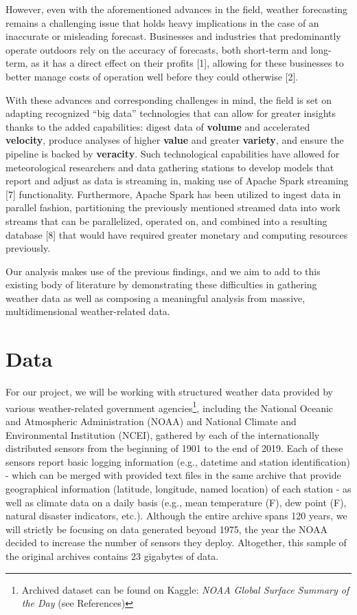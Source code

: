 \documentclass[conference]{IEEEtran}
\begin{document}
However, even with the aforementioned advances in the field, weather forecasting remains a challenging issue that holds heavy implications in the case of an inaccurate or misleading forecast. Businesses and industries that predominantly operate outdoors rely on the accuracy of forecasts, both short-term and long-term, as it has a direct effect on their profits [1], allowing for these businesses to better manage costs of operation well before they could otherwise [2].

With these advances and corresponding challenges in mind, the field is set on adapting recognized ``big data'' technologies that can allow for greater insights thanks to the added capabilities: digest data of \textbf{volume} and accelerated \textbf{velocity}, produce analyses of higher \textbf{value} and greater \textbf{variety}, and ensure the pipeline is backed by \textbf{veracity}. Such technological capabilities have allowed for meteorological researchers and data gathering stations to develop models that report and adjust as data is streaming in, making use of Apache Spark streaming [7] functionality. Furthermore, Apache Spark has been utilized to ingest data in parallel fashion, partitioning the previously mentioned streamed data into work streams that can be parallelized, operated on, and combined into a resulting database [8] that would have required greater monetary and computing resources previously.

Our analysis makes use of the previous findings, and we aim to add to this existing body of literature by demonstrating these difficulties in gathering weather data as well as composing a meaningful analysis from massive, multidimensional weather-related data.

\section{Data}

For our project, we will be working with structured weather data provided by various weather-related government agencies\footnote{Archived dataset can be found on Kaggle: \textit{NOAA Global Surface Summary of the Day} (see References)}, including the National Oceanic and Atmospheric Administration (NOAA) and National Climate and Environmental Institution (NCEI), gathered by each of the internationally distributed sensors from the beginning of 1901 to the end of 2019. Each of these sensors report basic logging information (e.g., datetime and station identification) - which can be merged with provided text files in the same archive that provide geographical information (latitude, longitude, named location) of each station - as well as climate data on a daily basis (e.g., mean temperature (F), dew point (F), natural disaster indicators, etc.). Although the entire archive spans 120 years, we will strictly be focusing on data generated beyond 1975, the year the NOAA decided to increase the number of sensors they deploy. Altogether, this sample of the original archives contains 23 gigabytes of data.
\end{document}
